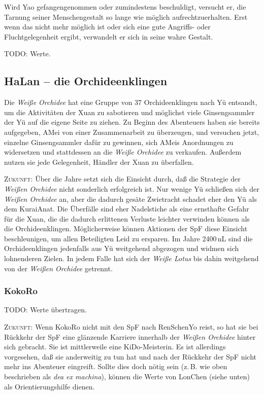 \documentclass[
a4paper,
twoside,
DIV=calc,
BCOR=4mm,
fontsize=9pt,
twocolumn=on,
titlepage=on,
parskip=half
]{scrartcl}
\begin{document}
Wird Yao gefangengenommen oder zumindestens beschuldigt, versucht er,
die Tarnung seiner Menschengestalt so lange wie möglich
aufrechtzuerhalten. Erst wenn das nicht mehr möglich ist oder sich
eine gute Angriffs- oder Fluchtgelegenheit ergibt, verwandelt er sich
in seine wahre Gestalt.

TODO: Werte.

\subsection{HaLan -- die Orchideenklingen}

Die \emph{Weiße Orchidee} hat eine Gruppe von 37 Orchideenklingen nach
Yü entsandt, um die Aktivitäten der Xuan zu sabotieren und möglichst
viele Ginsengsammler der Yü auf die eigene Seite zu ziehen. Zu Beginn
des Abenteuers haben sie bereits aufgegeben, AMei von einer
Zusammenarbeit zu überzeugen, und versuchen jetzt, einzelne
Ginsengsammler dafür zu gewinnen, sich AMeis Anordnungen zu
widersetzen und stattdessen an die \emph{Weiße Orchidee} zu
verkaufen. Außerdem nutzen sie jede Gelegenheit, Händler der Xuan zu
überfallen.

\textsc{Zukunft:} Über die Jahre setzt sich die Einsicht durch, daß
die Strategie der \emph{Weißen Orchidee} nicht sonderlich erfolgreich
ist. Nur wenige Yü schließen sich der \emph{Weißen Orchidee} an, aber
die dadurch gesäte Zwietracht schadet eher den Yü als dem KuraiAnat.
Die Überfälle sind eher Nadelstiche als eine ernsthafte Gefahr für die
Xuan, die die dadurch erlittenen Verluste leichter verwinden können als
die Orchideenklingen. Möglicherweise können Aktionen der SpF diese
Einsicht beschleunigen, um allen Beteiligten Leid zu ersparen. Im
Jahre 2400\,nL sind die Orchideenklingen jedenfalls aus Yü weitgehend
abgezogen und widmen sich lohnenderen Zielen. In jedem Falle hat sich
der \emph{Weiße Lotus} bis dahin weitgehend von der \emph{Weißen
  Orchidee} getrennt.

\subsubsection{KokoRo}


TODO: Werte übertragen.

\textsc{Zukunft:} Wenn KokoRo nicht mit den SpF nach RenSchenYo reist,
so hat sie bei Rückkehr der SpF eine glänzende Karriere innerhalb der
\emph{Weißen Orchidee} hinter sich gebracht. Sie ist mittlerweile eine
KiDo-Meisterin. Es ist allerdings vorgesehen, daß sie anderweitig zu
tun hat und nach der Rückkehr der SpF nicht mehr ins Abenteuer
eingreift. Sollte dies doch nötig sein (z.\,B. wie oben beschrieben
als \emph{dea ex machina}), können die Werte von LonChen (siehe
unten) als Orientierungshilfe dienen.
\end{document}

